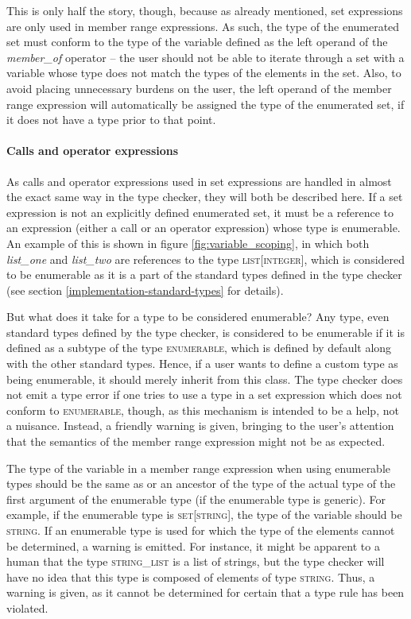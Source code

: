 This is only half the story, though, because as already mentioned, set expressions are only used in member range expressions. As such, the type of the enumerated set must conform to the type of the variable defined as the left operand of the \textit{member\_of} operator -- the user should not be able to iterate through a set with a variable whose type does not match the types of the elements in the set. Also, to avoid placing unnecessary burdens on the user, the left operand of the member range expression will automatically be assigned the type of the enumerated set, if it does not have a type prior to that point.
\paragraph{Calls and operator expressions}
As calls and operator expressions used in set expressions are handled in almost the exact same way in the type checker, they will both be described here. If a set expression is not an explicitly defined enumerated set, it must be a reference to an expression (either a call or an operator expression) whose type is enumerable. An example of this is shown in figure \ref{fig:variable_scoping}, in which both \textit{list\_one} and  \textit{list\_two} are references to the type \textsc{list}[\textsc{integer}], which is considered to be enumerable as it is a part of the standard types defined in the type checker (see section \ref{implementation-standard-types} for details).

But what does it take for a type to be considered enumerable? Any type, even standard types defined by the type checker, is considered to be enumerable if it is defined as a subtype of the type \textsc{enumerable}, which is defined by default along with the other standard types. Hence, if a user wants to define a custom type as being enumerable, it should merely inherit from this class. The type checker does not emit a type error if one tries to use a type in a set expression which does not conform to \textsc{enumerable}, though, as this mechanism is intended to be a help, not a nuisance. Instead, a friendly warning is given, bringing to the user's attention that the semantics of the member range expression might not be as expected.

The type of the variable in a member range expression when using enumerable types should be the same as or an ancestor of the type of the actual type of the first argument of the enumerable type (if the enumerable type is generic). For example, if the enumerable type is \textsc{set}[\textsc{string}], the type of the variable should be \textsc{string}. If an enumerable type is used for which the type of the elements cannot be determined, a warning is emitted. For instance, it might be apparent to a human that the type \textsc{string\_list} is a list of strings, but the type checker will have no idea that this type is composed of elements of type \textsc{string}. Thus, a warning is given, as it cannot be determined for certain that a type rule has been violated.
